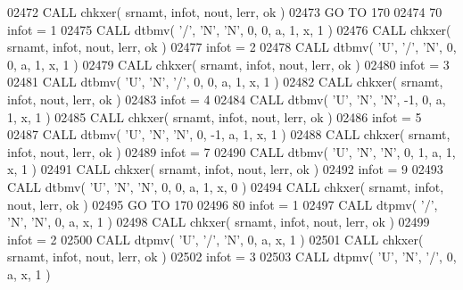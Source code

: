 \begin{DoxyCode}
02472       \textcolor{keyword}{CALL }chkxer( srnamt, infot, nout, lerr, ok )
02473       \textcolor{keywordflow}{GO TO} 170
02474    70 infot = 1
02475       \textcolor{keyword}{CALL }dtbmv( \textcolor{stringliteral}{'/'}, \textcolor{stringliteral}{'N'}, \textcolor{stringliteral}{'N'}, 0, 0, a, 1, x, 1 )
02476       \textcolor{keyword}{CALL }chkxer( srnamt, infot, nout, lerr, ok )
02477       infot = 2
02478       \textcolor{keyword}{CALL }dtbmv( \textcolor{stringliteral}{'U'}, \textcolor{stringliteral}{'/'}, \textcolor{stringliteral}{'N'}, 0, 0, a, 1, x, 1 )
02479       \textcolor{keyword}{CALL }chkxer( srnamt, infot, nout, lerr, ok )
02480       infot = 3
02481       \textcolor{keyword}{CALL }dtbmv( \textcolor{stringliteral}{'U'}, \textcolor{stringliteral}{'N'}, \textcolor{stringliteral}{'/'}, 0, 0, a, 1, x, 1 )
02482       \textcolor{keyword}{CALL }chkxer( srnamt, infot, nout, lerr, ok )
02483       infot = 4
02484       \textcolor{keyword}{CALL }dtbmv( \textcolor{stringliteral}{'U'}, \textcolor{stringliteral}{'N'}, \textcolor{stringliteral}{'N'}, -1, 0, a, 1, x, 1 )
02485       \textcolor{keyword}{CALL }chkxer( srnamt, infot, nout, lerr, ok )
02486       infot = 5
02487       \textcolor{keyword}{CALL }dtbmv( \textcolor{stringliteral}{'U'}, \textcolor{stringliteral}{'N'}, \textcolor{stringliteral}{'N'}, 0, -1, a, 1, x, 1 )
02488       \textcolor{keyword}{CALL }chkxer( srnamt, infot, nout, lerr, ok )
02489       infot = 7
02490       \textcolor{keyword}{CALL }dtbmv( \textcolor{stringliteral}{'U'}, \textcolor{stringliteral}{'N'}, \textcolor{stringliteral}{'N'}, 0, 1, a, 1, x, 1 )
02491       \textcolor{keyword}{CALL }chkxer( srnamt, infot, nout, lerr, ok )
02492       infot = 9
02493       \textcolor{keyword}{CALL }dtbmv( \textcolor{stringliteral}{'U'}, \textcolor{stringliteral}{'N'}, \textcolor{stringliteral}{'N'}, 0, 0, a, 1, x, 0 )
02494       \textcolor{keyword}{CALL }chkxer( srnamt, infot, nout, lerr, ok )
02495       \textcolor{keywordflow}{GO TO} 170
02496    80 infot = 1
02497       \textcolor{keyword}{CALL }dtpmv( \textcolor{stringliteral}{'/'}, \textcolor{stringliteral}{'N'}, \textcolor{stringliteral}{'N'}, 0, a, x, 1 )
02498       \textcolor{keyword}{CALL }chkxer( srnamt, infot, nout, lerr, ok )
02499       infot = 2
02500       \textcolor{keyword}{CALL }dtpmv( \textcolor{stringliteral}{'U'}, \textcolor{stringliteral}{'/'}, \textcolor{stringliteral}{'N'}, 0, a, x, 1 )
02501       \textcolor{keyword}{CALL }chkxer( srnamt, infot, nout, lerr, ok )
02502       infot = 3
02503       \textcolor{keyword}{CALL }dtpmv( \textcolor{stringliteral}{'U'}, \textcolor{stringliteral}{'N'}, \textcolor{stringliteral}{'/'}, 0, a, x, 1 )

\end{DoxyCode}
